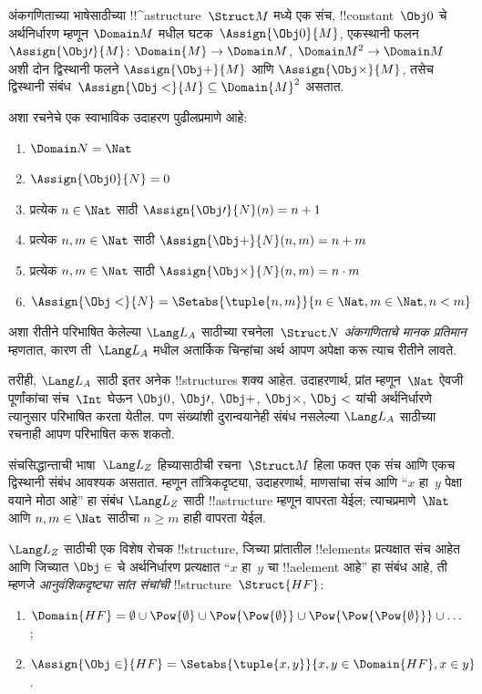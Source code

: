 \documentclass[../../../include/open-logic-section]{subfiles}
\begin{document}
\begin{ex}
अंकगणिताच्या भाषेसाठीच्या !!^a{structure}~$\Struct M$ मध्ये एक संच,
!!{constant}~$\Obj 0$ चे अर्थनिर्धारण म्हणून $\Domain M$ मधील
घटक~$\Assign{\Obj 0}{M}$, एकस्थानी फलन
$\Assign{\Obj \prime}{M} \colon \Domain{M} \to \Domain M$,
$\Domain M^2 \to \Domain M$ अशी दोन द्विस्थानी फलने
$\Assign{\Obj +}{M}$ आणि $\Assign{\Obj \times}{M}$, तसेच द्विस्थानी
संबंध~$\Assign{\Obj <}{M} \subseteq \Domain{M}^2$ असतात.

अशा रचनेचे एक स्वाभाविक उदाहरण पुढीलप्रमाणे आहे:
\begin{enumerate}
\item $\Domain N = \Nat$
\item $\Assign{\Obj 0}{N} = 0$
\item प्रत्येक $n \in \Nat$ साठी $\Assign{\Obj \prime}{N}(n) = n + 1$
\item प्रत्येक $n, m \in \Nat$ साठी $\Assign{\Obj +}{N}(n, m) = n + m$
\item प्रत्येक $n, m \in \Nat$ साठी $\Assign{\Obj \times}{N}(n, m) = n\cdot m$
\item $\Assign{\Obj <}{N} = \Setabs{\tuple{n, m}}{n \in \Nat, m \in
  \Nat, n < m}$
\end{enumerate}
अशा रीतीने परिभाषित केलेल्या $\Lang L_A$ साठीच्या रचनेला~$\Struct N$
\emph{अंकगणिताचे मानक प्रतिमान} म्हणतात, कारण ती~$\Lang L_A$ मधील
अतार्किक चिन्हांचा अर्थ आपण अपेक्षा करू त्याच रीतीने लावते.

तरीही, $\Lang L_A$ साठी इतर अनेक !!{structure}s शक्य आहेत. उदाहरणार्थ,
प्रांत म्हणून~$\Nat$ ऐवजी पूर्णांकांचा संच~$\Int$ घेऊन $\Obj 0$,
$\Obj \prime$, $\Obj +$, $\Obj \times$, $\Obj <$ यांची अर्थनिर्धारणे
त्यानुसार परिभाषित करता येतील. पण संख्यांशी दुरान्वयानेही संबंध नसलेल्या
$\Lang L_A$ साठीच्या रचनाही आपण परिभाषित करू शकतो.
\end{ex}

\begin{ex}
संचसिद्धान्ताची भाषा~$\Lang L_Z$ हिच्यासाठीची रचना~$\Struct M$ हिला
फक्त एक संच आणि एकच द्विस्थानी संबंध आवश्यक असतात. म्हणून तांत्रिकदृष्ट्या,
उदाहरणार्थ, माणसांचा संच आणि ``$x$ हा~$y$ पेक्षा वयाने मोठा आहे'' हा संबंध
$\Lang L_Z$ साठी !!a{structure} म्हणून वापरता येईल; त्याचप्रमाणे~$\Nat$
आणि $n, m \in \Nat$ साठीचा $n \ge m$ हाही वापरता येईल.
%

$\Lang L_Z$ साठीची एक विशेष रोचक !!{structure}, जिच्या प्रांतातील
!!{element}s प्रत्यक्षात संच आहेत आणि जिच्यात $\Obj \in$ चे अर्थनिर्धारण
प्रत्यक्षात ``$x$ हा~$y$ चा !!a{element} आहे'' हा संबंध आहे, ती म्हणजे
\emph{आनुवंशिकदृष्ट्या सांत संचांची} !!{structure}~$\Struct{{HF}}$:
\begin{enumerate}
\item $\Domain{{{HF}}} = \emptyset \cup \Pow{\emptyset} \cup
  \Pow{\Pow{\emptyset}} \cup \Pow{\Pow{\Pow{\emptyset}}} \cup \dots$;
\item $\Assign{\Obj \in}{{{HF}}} = \Setabs{\tuple{x, y}}{x, y \in
  \Domain{{{HF}}}, x \in y}$.
\end{enumerate}
\end{ex}
\end{document}
